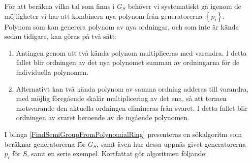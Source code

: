 \label{SearchPolynomials}
För att beräkna vilka tal som finns i $G_S$ behöver vi systematiskt gå igenom de möjligheter vi har att kombinera nya polynom från generatorerna $\left\{p_i\right\}$. Polynom som kan generera polynom av nya ordningar, och som inte är kända sedan tidigare, kan göras på två sätt:

\begin{enumerate}
\item Antingen genom att två kända polynom multipliceras med varandra. I detta fallet blir ordningen av det nya polynomet summan av ordningarna för de individuella polynomen.

\item Alternativt kan två kända polynom av samma ordning adderas till varandra, med möjlig föregående skalär multiplicering av det ena, så att termen motsvarande den aktuella ordningen elimineras från svaret. I detta fallet blir ordningen av svaret beroende av de ingående polynomen.
\end{enumerate}

I bilaga \ref{FindSemiGroupFromPolynomialRing} presenteras en sökalgoritm som beräknar generatorerna för $G_S$, samt även hur dessa uppnås givet generatorerna $p_i$ för $S$, samt en serie exempel. Kortfattat gör algoritmen följande:

